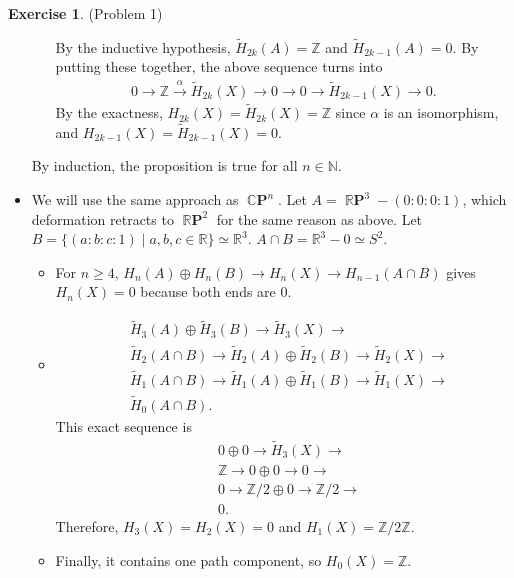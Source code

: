 \documentclass[psamsfonts]{amsart}
\theoremstyle{definition}
\newtheorem*{exer}{Exercise}
\theoremstyle{remark}
\DeclareMathOperator{\CP}{\mathbb{C}\mathbf{P}}
\DeclareMathOperator{\RP}{\mathbb{R}\mathbf{P}}
\numberwithin{equation}{section}
\begin{document}
\begin{exer}{(Problem 1)}
\begin{itemize}
\begin{itemize}
          By the inductive hypothesis, $\tilde{H}_{2k}(A) = \mathbb{Z}$ and $\tilde{H}_{2k - 1}(A) = 0$.
          By putting these together, the above sequence turns into
          \begin{align*}
            0 \rightarrow \mathbb{Z} \xrightarrow{\alpha} \tilde{H}_{2k}(X) \rightarrow
            0 \rightarrow 0 \rightarrow \tilde{H}_{2k - 1}(X) \rightarrow
            0.
          \end{align*}
          By the exactness, $H_{2k}(X) = \tilde{H}_{2k}(X) = \mathbb{Z}$ since $\alpha$ is an isomorphism, and $H_{2k - 1}(X) = \tilde{H}_{2k - 1}(X) = 0$.
       \end{itemize}
       By induction, the proposition is true for all $n \in \mathbb{N}$.
     \item
       We will use the same approach as $\CP^n$.
       Let $A = \RP^3 - (0:0:0:1)$, which deformation retracts to $\RP^2$ for the same reason as above.
       Let $B = \{ (a:b:c:1) \mid a, b, c \in \mathbb{R} \} \simeq \mathbb{R}^3$.
       $A \cap B = \mathbb{R}^3 - 0 \simeq S^2$.
       \begin{itemize}
         \item
           For $n \geq 4$, $H_n(A) \oplus H_n(B) \rightarrow H_n(X) \rightarrow H_{n - 1}(A \cap B)$ gives $H_n(X) = 0$ because both ends are 0.
         \item
           \begin{align*}
             &\tilde{H}_{3}(A) \oplus \tilde{H}_{3}(B) \rightarrow \tilde{H}_{3}(X) \rightarrow \\
             &\tilde{H}_{2}(A \cap B) \rightarrow \tilde{H}_{2}(A) \oplus \tilde{H}_{2}(B) \rightarrow \tilde{H}_{2}(X) \rightarrow \\
             &\tilde{H}_{1}(A \cap B) \rightarrow \tilde{H}_{1}(A) \oplus \tilde{H}_{1}(B) \rightarrow \tilde{H}_{1}(X) \rightarrow \\
             &\tilde{H}_{0}(A \cap B).
           \end{align*}
           This exact sequence is
           \begin{align*}
             &0 \oplus 0 \rightarrow \tilde{H}_{3}(X) \rightarrow \\
             &\mathbb{Z} \rightarrow 0 \oplus 0 \rightarrow 0 \rightarrow \\
             &0 \rightarrow \mathbb{Z}/2 \oplus 0 \rightarrow \mathbb{Z}/2 \rightarrow \\
             &0.
           \end{align*}
           Therefore, $H_3(X) = H_2(X) = 0$ and $H_1(X) = \mathbb{Z}/2\mathbb{Z}$.
         \item
          Finally, it contains one path component, so $H_0(X) = \mathbb{Z}$.
       \end{itemize}
  \end{itemize}
\end{exer}
\end{document}
